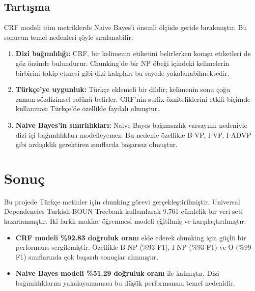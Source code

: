\documentclass[12pt,a4paper]{article}
\begin{document}
\subsection{Tartışma}

CRF modeli tüm metriklerde Naive Bayes'i önemli ölçüde geride bırakmıştır.
Bu sonucun temel nedenleri şöyle sıralanabilir:

\begin{enumerate}
    \item \textbf{Dizi bağımlılığı:} CRF, bir kelimenin etiketini belirlerken komşu etiketleri
    de göz önünde bulundurur. Chunking'de bir NP öbeği içindeki kelimelerin birbirini
    takip etmesi gibi dizi kalıpları bu sayede yakalanabilmektedir.

    \item \textbf{Türkçe'ye uygunluk:} Türkçe eklemeli bir dildir; kelimenin sonu çoğu zaman
    sözdizimsel rolünü belirler. CRF'nin suffix özniteliklerini etkili biçimde kullanması
    Türkçe'de özellikle faydalı olmuştur.

    \item \textbf{Naive Bayes'in sınırlılıkları:} Naive Bayes bağımsızlık varsayımı nedeniyle
    dizi içi bağımlılıkları modelleyemez. Bu nedenle özellikle B-VP, I-VP, I-ADVP gibi
    ardışıklık gerektiren sınıflarda başarısız olmuştur.
\end{enumerate}

\section{Sonuç}

Bu projede Türkçe metinler için chunking görevi gerçekleştirilmiştir. Universal Dependencies
Turkish-BOUN Treebank kullanılarak 9.761 cümlelik bir veri seti hazırlanmıştır. İki farklı
makine öğrenmesi modeli eğitilmiş ve karşılaştırılmıştır:

\begin{itemize}
    \item \textbf{CRF modeli \%92.83 doğruluk oranı} elde ederek chunking için güçlü bir
    performans sergilemiştir. Özellikle B-NP (\%93 F1), I-NP (\%93 F1) ve O (\%99 F1)
    sınıflarında çok başarılı sonuçlar alınmıştır.

    \item \textbf{Naive Bayes modeli \%51.29 doğruluk oranı} ile kalmıştır. Dizi
    bağımlılıklarını yakalayamaması bu düşük performansın temel nedenidir.
\end{itemize}
\end{document}
